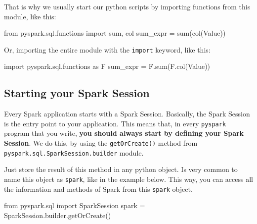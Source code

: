 \documentclass[
  11pt,
  letterpaper,
  DIV=11,
  numbers=noendperiod]{scrreprt}
\newenvironment{Shaded}{\begin{snugshade}}{\end{snugshade}}
\newcommand{\BuiltInTok}[1]{\textcolor[rgb]{0.00,0.23,0.31}{#1}}
\newcommand{\ImportTok}[1]{\textcolor[rgb]{0.00,0.46,0.62}{#1}}
\newcommand{\NormalTok}[1]{\textcolor[rgb]{0.00,0.23,0.31}{#1}}
\newcommand{\OperatorTok}[1]{\textcolor[rgb]{0.37,0.37,0.37}{#1}}
\newcommand{\StringTok}[1]{\textcolor[rgb]{0.13,0.47,0.30}{#1}}
\begin{document}
That is why we usually start our python scripts by importing functions
from this module, like this:

\begin{Shaded}
\begin{Highlighting}[]
\ImportTok{from}\NormalTok{ pyspark.sql.functions }\ImportTok{import} \BuiltInTok{sum}\NormalTok{, col}
\NormalTok{sum\_expr }\OperatorTok{=} \BuiltInTok{sum}\NormalTok{(col(}\StringTok{\textquotesingle{}Value\textquotesingle{}}\NormalTok{))}
\end{Highlighting}
\end{Shaded}

Or, importing the entire module with the \texttt{import} keyword, like
this:

\begin{Shaded}
\begin{Highlighting}[]
\ImportTok{import}\NormalTok{ pyspark.sql.functions }\ImportTok{as}\NormalTok{ F}
\NormalTok{sum\_expr }\OperatorTok{=}\NormalTok{ F.}\BuiltInTok{sum}\NormalTok{(F.col(}\StringTok{\textquotesingle{}Value\textquotesingle{}}\NormalTok{))}
\end{Highlighting}
\end{Shaded}

\subsection{Starting your Spark
Session}\label{starting-your-spark-session}

Every Spark application starts with a Spark Session. Basically, the
Spark Session is the entry point to your application. This means that,
in every \texttt{pyspark} program that you write, \textbf{you should
always start by defining your Spark Session}. We do this, by using the
\texttt{getOrCreate()} method from
\texttt{pyspark.sql.SparkSession.builder} module.

Just store the result of this method in any python object. Is very
common to name this object as \texttt{spark}, like in the example below.
This way, you can access all the information and methods of Spark from
this \texttt{spark} object.

\begin{Shaded}
\begin{Highlighting}[]
\ImportTok{from}\NormalTok{ pyspark.sql }\ImportTok{import}\NormalTok{ SparkSession}
\NormalTok{spark }\OperatorTok{=}\NormalTok{ SparkSession.builder.getOrCreate()}
\end{Highlighting}
\end{Shaded}
\end{document}
